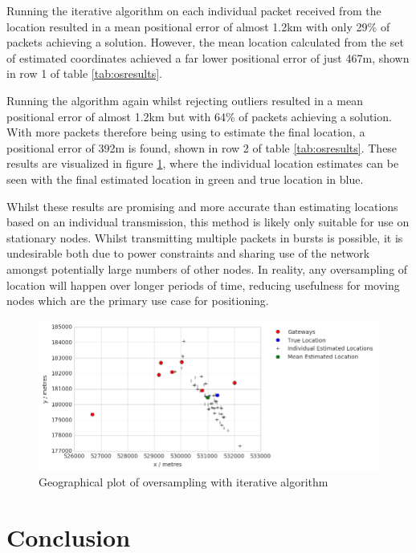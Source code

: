 \documentclass[a4paper]{report}
\begin{document}
    Running the iterative algorithm on each individual packet received from the location resulted in a mean positional error of almost 1.2km with only 29\% of packets achieving a solution. However, the mean location calculated from the set of estimated coordinates achieved a far lower positional error of just 467m, shown in row 1 of table \ref{tab:osresults}.

    Running the algorithm again whilst rejecting outliers resulted in a mean positional error of almost 1.2km but with 64\% of packets achieving a solution. With more packets therefore being using to estimate the final location, a positional error of 392m is found, shown in row 2 of table \ref{tab:osresults}. These results are visualized in figure \ref{fig:oversampleplot}, where the individual location estimates can be seen with the final estimated location in green and true location in blue.

    Whilst these results are promising and more accurate than estimating locations based on an individual transmission, this method is likely only suitable for use on stationary nodes. Whilst transmitting multiple packets in bursts is possible, it is undesirable both due to power constraints and sharing use of the network amongst potentially large numbers of other nodes. In reality, any oversampling of location will happen over longer periods of time, reducing usefulness for moving nodes which are the primary use case for positioning.

    \begin{figure}[ht]
    \centering
    \includegraphics[width=16cm]{figures/oversampleplot.png}
    \caption{Geographical plot of oversampling with iterative algorithm}
    \label{fig:oversampleplot}
    \end{figure}



\chapter{Conclusion}
\end{document}
